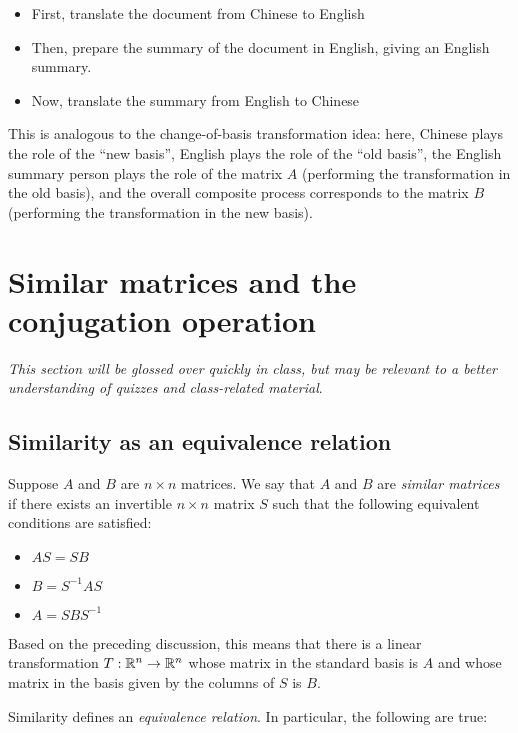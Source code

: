 \documentclass[10pt]{amsart}
\begin{document}
\begin{itemize}
\item First, translate the document from Chinese to English
\item Then, prepare the summary of the document in English, giving an English summary.
\item Now, translate the summary from English to Chinese
\end{itemize}

This is analogous to the change-of-basis transformation idea: here,
Chinese plays the role of the ``new basis'', English plays the role of
the ``old basis'', the English summary person plays the role of the
matrix $A$ (performing the transformation in the old basis), and the
overall composite process corresponds to the matrix $B$ (performing
the transformation in the new basis).

\section{Similar matrices and the conjugation operation}

{\em This section will be glossed over quickly in class, but may be
  relevant to a better understanding of quizzes and class-related
  material}.

\subsection{Similarity as an equivalence relation}

Suppose $A$ and $B$ are $n \times n$ matrices. We say that $A$ and $B$
are {\em similar matrices} if there exists an invertible $n \times n$
matrix $S$ such that the following equivalent conditions are
satisfied:

\begin{itemize}
\item $AS = SB$
\item $B  = S^{-1}AS$
\item $A = SBS^{-1}$
\end{itemize}

Based on the preceding discussion, this means that there is a linear
transformation $T:\mathbb{R}^n \to \mathbb{R}^n$ whose matrix in the standard basis is
$A$ and whose matrix in the basis given by the columns of $S$ is $B$.

Similarity defines an {\em equivalence relation}. In particular, the
following are true:
\end{document}
